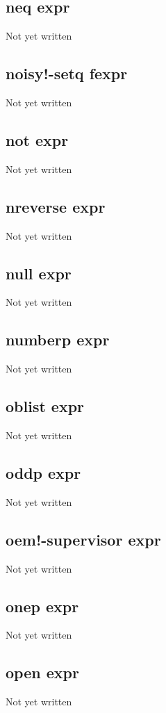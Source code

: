 \documentclass[a4paper,11pt]{article}
\begin{document}
{\subsection{\ttfamily neq expr}
   Not yet written

\subsection{\ttfamily noisy!-setq fexpr}
   Not yet written

\subsection{\ttfamily not expr}
   Not yet written

\subsection{\ttfamily nreverse expr}
   Not yet written

\subsection{\ttfamily null expr}
   Not yet written

\subsection{\ttfamily numberp expr}
   Not yet written

\subsection{\ttfamily oblist expr}
   Not yet written

\subsection{\ttfamily oddp expr}
   Not yet written

\subsection{\ttfamily oem!-supervisor expr}
   Not yet written

\subsection{\ttfamily onep expr}
   Not yet written

\subsection{\ttfamily open expr}
   Not yet written

}
\end{document}
